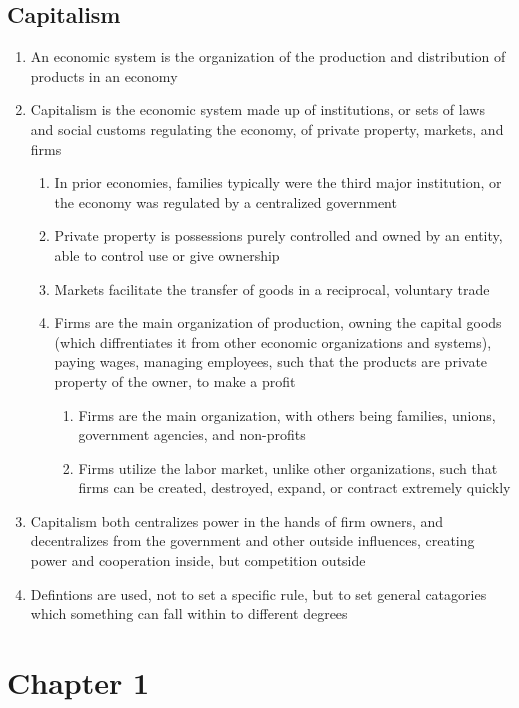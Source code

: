 \documentclass[11 pt, twoside]{article}
\begin{document}
\subsection{Capitalism}
\begin{enumerate}
\item An economic system is the organization of the production and distribution of products in an economy
\item Capitalism is the economic system made up of institutions, or sets of laws and social customs regulating the economy, of private property, markets, and firms
\begin{enumerate}
\item In prior economies, families typically were the third major institution, or the economy was regulated by a centralized government
\item Private property is possessions purely controlled and owned by an entity, able to control use or give ownership
\item Markets facilitate the transfer of goods in a reciprocal, voluntary trade
\item Firms are the main organization of production, owning the capital goods (which diffrentiates it from other economic organizations and systems), paying wages, managing employees, such that the products are private property of the owner, to make a profit
\begin{enumerate}
\item Firms are the main organization, with others being families, unions, government agencies, and non-profits
\item Firms utilize the labor market, unlike other organizations, such that firms can be created, destroyed, expand, or contract extremely quickly
\end{enumerate} 
\end{enumerate}
\item Capitalism both centralizes power in the hands of firm owners, and decentralizes from the government and other outside influences, creating power and cooperation inside, but competition outside
\item Defintions are used, not to set a specific rule, but to set general catagories which something can fall within to different degrees
\end{enumerate}

\section{Chapter 1}
\end{document}
